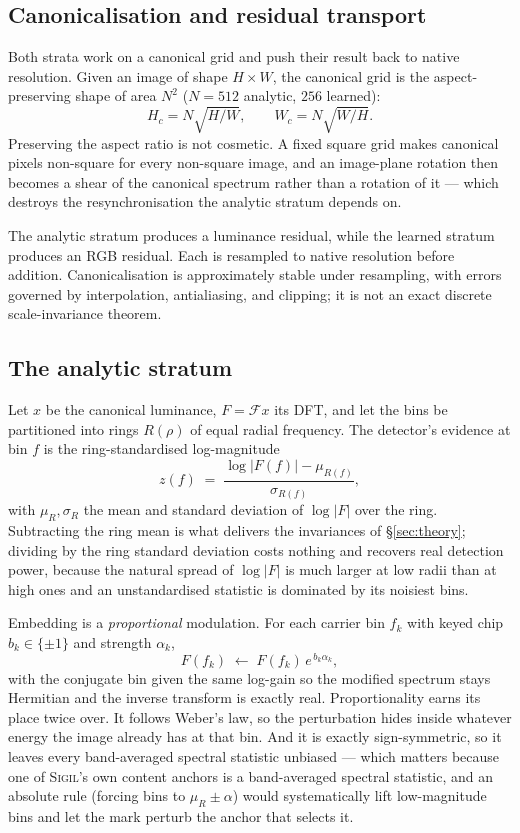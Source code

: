 \documentclass[10pt,twocolumn]{article}
\theoremstyle{definition}
\theoremstyle{remark}
\newcommand{\sigil}{\textsc{Sigil}}
\begin{document}
\subsection{Canonicalisation and residual transport}

Both strata work on a canonical grid and push their result back to native
resolution. Given an image of shape $H\times W$, the canonical grid is the
aspect-preserving shape of area $N^{2}$ ($N=512$ analytic, $256$ learned):
\[
  H_c = N\sqrt{H/W},\qquad W_c = N\sqrt{W/H}.
\]
Preserving the aspect ratio is not cosmetic. A fixed square grid makes canonical
pixels non-square for every non-square image, and an image-plane rotation then
becomes a shear of the canonical spectrum rather than a rotation of it --- which
destroys the resynchronisation the analytic stratum depends on.

The analytic stratum produces a luminance residual, while the learned stratum
produces an RGB residual. Each is resampled to native resolution before addition.
Canonicalisation is approximately stable under resampling, with errors governed
by interpolation, antialiasing, and clipping; it is not an exact discrete
scale-invariance theorem.

\subsection{The analytic stratum}
\label{sec:analytic}

Let $x$ be the canonical luminance, $F=\mathcal{F}x$ its DFT, and let the bins be
partitioned into rings $R(\rho)$ of equal radial frequency. The detector's
evidence at bin $f$ is the ring-standardised log-magnitude
\begin{equation}
  z(f) \;=\; \frac{\log|F(f)| - \mu_{R(f)}}{\sigma_{R(f)}},
  \label{eq:excess}
\end{equation}
with $\mu_R,\sigma_R$ the mean and standard deviation of $\log|F|$ over the ring.
Subtracting the ring mean is what delivers the invariances of
\S\ref{sec:theory}; dividing by the ring standard deviation costs nothing and
recovers real detection power, because the natural spread of $\log|F|$ is much
larger at low radii than at high ones and an unstandardised statistic is
dominated by its noisiest bins.

Embedding is a \emph{proportional} modulation. For each carrier bin $f_k$ with
keyed chip $b_k\in\{\pm1\}$ and strength $\alpha_k$,
\begin{equation}
  F(f_k) \;\longleftarrow\; F(f_k)\,e^{\,b_k \alpha_k},
  \label{eq:embed}
\end{equation}
with the conjugate bin given the same log-gain so the modified spectrum stays
Hermitian and the inverse transform is exactly real. Proportionality earns its
place twice over. It follows Weber's law, so the perturbation hides inside
whatever energy the image already has at that bin. And it is exactly
sign-symmetric, so it leaves every band-averaged spectral statistic unbiased ---
which matters because one of \sigil{}'s own content anchors is a band-averaged
spectral statistic, and an absolute rule (forcing bins to $\mu_R\pm\alpha$) would
systematically lift low-magnitude bins and let the mark perturb the anchor that
selects it.
\end{document}
